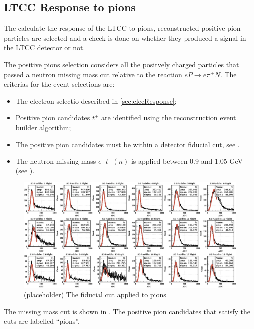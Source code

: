 \subsection{LTCC Response to pions}

The calculate the response of the LTCC to pions, reconstructed positive pion particles are selected
and a check is done on whether they produced a signal in the LTCC detector or not.

The positive pions selection considers all the positvely charged particles that passed a neutron missing mass
cut relative to the reaction $eP\rightarrow e\pi^+N$.
The criterias for the event selections are:

\begin{itemize}
	\item  The electron selectio described in \ref{sec:elecResponse};
    \item Positive pion candidates $t^+$ are identified using the reconstruction event builder algorithm;
    \item The positive pion candidates must be within a detector fiducial cut, see .
	\item The neutron missing mass $e^-t^+(n)$ is applied between 0.9 and 1.05 GeV (see ).
\end{itemize}

\begin{figure}
	\centering
	\includegraphics[width=0.98\columnwidth,keepaspectratio]{img/neutronMM.png}
	\caption{(placeholder) The fiducial cut applied to pions}
	\label{fig:detFiducialCut}
\end{figure}


The missing mass cut is shown in . The positive pion candidates that satisfy the cuts are
labelled ``pions''.

